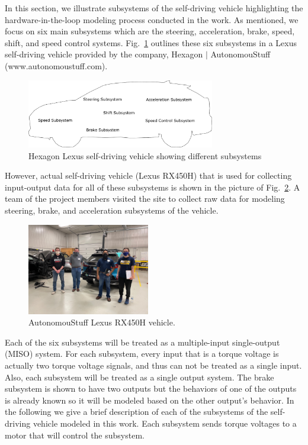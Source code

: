 \documentclass[conference]{IEEEtran}
\begin{document}
In this section, we illustrate subsystems of the self-driving vehicle highlighting  the hardware-in-the-loop modeling process conducted in the work. %
As mentioned, we focus on  six  main subsystems which are the steering, acceleration, brake, speed, shift, and speed control systems. Fig.~\ref{fig:highLevelSystemArchitecture} outlines these six subsystems in a Lexus self-driving vehicle provided by the company, Hexagon $|$ AutonomouStuff (www.autonomoustuff.com). %
%
\begin{figure}[htbp]
  \centering
  \includegraphics[height=3cm]{figs/inkscape/carSystemModelOutline}
  \caption{Hexagon Lexus self-driving vehicle showing different subsystems}
  \label{fig:highLevelSystemArchitecture}
\end{figure}
%
However, actual self-driving vehicle (Lexus RX450H) that is used for collecting input-output data for all of these subsystems is shown in the picture of Fig.~\ref{fig:lexusvehicle}. A team of the project members visited the site to collect raw data for modeling  steering, brake, and acceleration subsystems of the vehicle. %
%
\begin{figure}[htbp]
	\centering
	\includegraphics[height=4cm]{figs/img/picturesVisitToAStuff/visitors1-20211007}
	\caption{AutonomouStuff Lexus RX450H vehicle.}
	\label{fig:lexusvehicle}
\end{figure}
%


Each of the six subsystems will be treated as a multiple-input single-output (MISO) system. For each subsystem, every input that is a torque voltage is actually two torque voltage signals, and thus can not be treated as a single input. Also, each subsystem will be treated as a single output system. The brake subsystem is shown to have two outputs but the behaviors of one of the outputs is already known so it will be modeled based on the other output's behavior. In the following we give a brief description of each of the subsystems of the self-driving vehicle modeled in this work. Each subsystem sends torque voltages to a motor that will control the subsystem.
\end{document}
